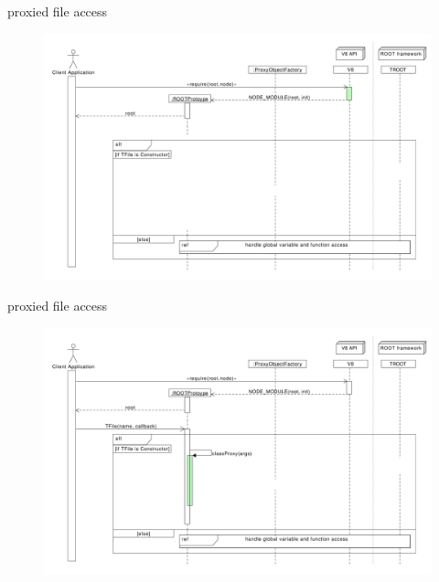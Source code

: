 \begin{frame}{proxied file access}
  \begin{figure}[htb]
    \centering
      \includegraphics[width=\textwidth, height=.85\textheight, keepaspectratio]{./resources/proxycall/fileOpen_h2.pdf}
  \end{figure}
\end{frame}

\begin{frame}{proxied file access}
  \begin{figure}[htb]
    \centering
      \includegraphics[width=\textwidth, height=.85\textheight, keepaspectratio]{./resources/proxycall/fileOpen_h3.pdf}
  \end{figure}
\end{frame}


